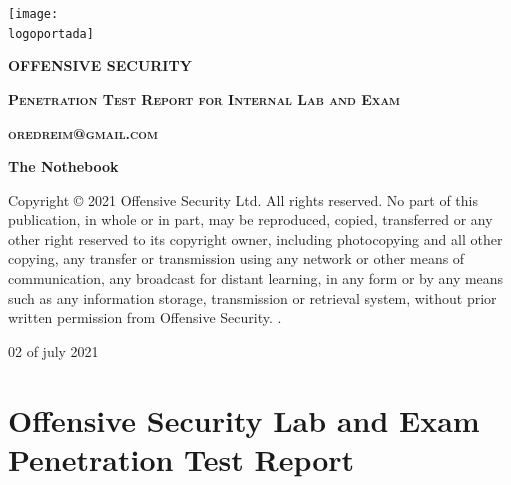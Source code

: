 \documentclass[a4paper]{article}
\newcommand{\logoportada}{imagenes/offensive-security-logo.png} %
\newcommand{\machinename}{The Nothebook} %
\newcommand{\startdate}{02 of july 2021}
\begin{document}

    \begin{titlepage}
        \centering
            \texttt{[image: \\logoportada]}\par\vspace{1cm}
            \vfill
            {\scshape\LARGE \textbf{OFFENSIVE SECURITY}} \par\vspace{1cm}
            \vfill
            {\scshape\LARGE \textbf{Penetration Test Report for Internal Lab and Exam}} \par\vspace{1cm}
            \vfill
            {\scshape\LARGE \textbf{oredreim@gmail.com}} \par\vspace{1cm}
            \vfill
            {\Huge\bfseries\textcolor{greenPortada}{\machinename}}
            \vfill
            \vfill
            \begin{tcolorbox}[colback=red!5!white,colframe=red!75!black]
                \centering
                Copyright © 2021 Offensive Security Ltd. All rights reserved.
                No part of this publication, in whole or in part, may be reproduced, copied, transferred or any other right reserved to its copyright owner, including photocopying and all other copying, any transfer or transmission using any network or other means of communication, any broadcast for distant learning, in any form or by any means such as any information storage, transmission or retrieval system, without prior written permission from Offensive Security.
                .
            \end{tcolorbox}
            \vfill
            \vfill
            {\large \startdate\par}
            \vfill
    \end{titlepage}


    \clearpage
    \tableofcontents
    \clearpage
    \section{Offensive Security Lab and Exam Penetration Test Report}
\end{document}
